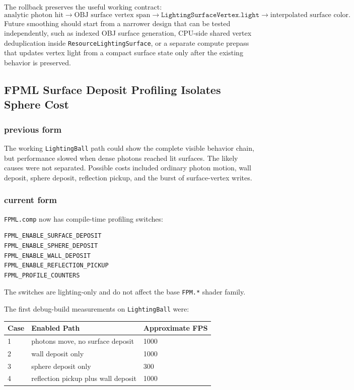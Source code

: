 The rollback preserves the useful working contract:
\[
    \textrm{analytic photon hit}
    \rightarrow
    \textrm{OBJ surface vertex span}
    \rightarrow
    \texttt{LightingSurfaceVertex.light}
    \rightarrow
    \textrm{interpolated surface color}.
\]
Future smoothing should start from a narrower design that can be tested
independently, such as indexed OBJ surface generation, CPU-side shared vertex
deduplication inside \texttt{ResourceLightingSurface}, or a separate compute
prepass that updates vertex light from a compact surface state only after the
existing behavior is preserved.

\subsection{FPML Surface Deposit Profiling Isolates Sphere Cost}

\subsubsection{previous form}

The working \texttt{LightingBall} path could show the complete visible
behavior chain, but performance slowed when dense photons reached lit
surfaces.  The likely causes were not separated.  Possible costs included
ordinary photon motion, wall deposit, sphere deposit, reflection pickup, and
the burst of surface-vertex writes.

\subsubsection{current form}

\texttt{FPML.comp} now has compile-time profiling switches:
\begin{verbatim}
FPML_ENABLE_SURFACE_DEPOSIT
FPML_ENABLE_SPHERE_DEPOSIT
FPML_ENABLE_WALL_DEPOSIT
FPML_ENABLE_REFLECTION_PICKUP
FPML_PROFILE_COUNTERS
\end{verbatim}
The switches are lighting-only and do not affect the base \texttt{FPM.*}
shader family.

The first debug-build measurements on \texttt{LightingBall} were:
\begin{center}
\begin{tabular}{lll}
\toprule
Case & Enabled Path & Approximate FPS \\
\midrule
1 & photons move, no surface deposit & 1000 \\
2 & wall deposit only & 1000 \\
3 & sphere deposit only & 300 \\
4 & reflection pickup plus wall deposit & 1000 \\
\bottomrule
\end{tabular}
\end{center}

